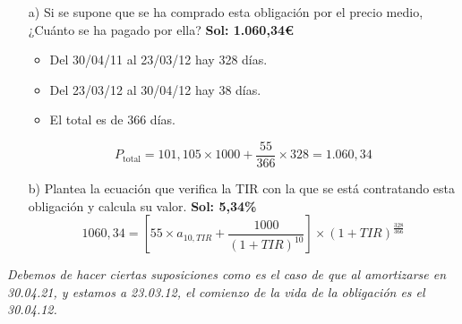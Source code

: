 \begin{enumerate}
\begin{tikzpicture}
    
    
    
    
    
    \end{tikzpicture}
    
    \begin{enumerate}
        \item[a)] Si se supone que se ha comprado esta obligación por el precio medio, ¿Cuánto se ha pagado por ella? \textbf{Sol: 1.060,34€}
        
        \begin{itemize}
            \item Del 30/04/11 al 23/03/12 hay 328 días.
            \item Del 23/03/12 al 30/04/12 hay 38 días.
            \item El total es de 366 días.
        \end{itemize}

        \begin{equation*}
            P_{\text{total}} = 101,105 \times 1000 + \frac{55}{366} \times 328 = 1.060,34
        \end{equation*}
        \item[b)] Plantea la ecuación que verifica la TIR con la que se está contratando esta obligación y calcula su valor. \textbf{Sol: 5,34\%}
        \begin{equation*}
            1060,34 = \left[55 \times a_{10,TIR}+\frac{1000}{(1+TIR)^{10}}\right]\times(1+TIR)^{\frac{328}{366}}
        \end{equation*}
    \end{enumerate}
\end{enumerate}

\textit{Debemos de hacer ciertas suposiciones como es el caso de que al amortizarse en 30.04.21, y estamos a 23.03.12, el comienzo de la vida de la obligación es el 30.04.12.}
\\\\

